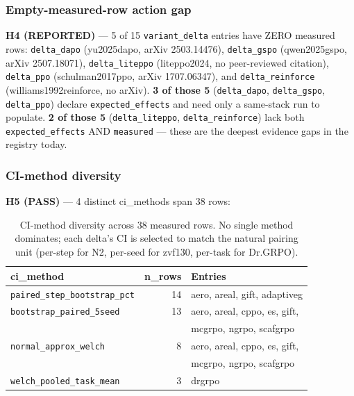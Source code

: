 \documentclass{article}
\begin{document}
\subsubsection{Empty-measured-row action gap}
\label{sec:p6-iter134-empty-action-gap}

\textbf{H4 (REPORTED)} --- 5 of 15 \texttt{variant\_delta} entries have
ZERO measured rows: \texttt{delta\_dapo} (yu2025dapo, arXiv 2503.14476),
\texttt{delta\_gspo} (qwen2025gspo, arXiv 2507.18071),
\texttt{delta\_liteppo} (liteppo2024, no peer-reviewed citation),
\texttt{delta\_ppo} (schulman2017ppo, arXiv 1707.06347), and
\texttt{delta\_reinforce} (williams1992reinforce, no arXiv).
\textbf{3 of those 5} (\texttt{delta\_dapo}, \texttt{delta\_gspo},
\texttt{delta\_ppo}) declare \texttt{expected\_effects} and need only a
same-stack run to populate. \textbf{2 of those 5}
(\texttt{delta\_liteppo}, \texttt{delta\_reinforce}) lack both
\texttt{expected\_effects} AND \texttt{measured} --- these are the
deepest evidence gaps in the registry today.

\subsubsection{CI-method diversity}
\label{sec:p6-iter134-ci-method-diversity}

\textbf{H5 (PASS)} --- 4 distinct ci\_methods span 38 rows:

\begin{table}[h]
\centering
\small
\begin{tabular}{lrl}
\toprule
\textbf{ci\_method} & \textbf{n\_rows} & \textbf{Entries} \\
\midrule
\texttt{paired\_step\_bootstrap\_pct} & 14 & aero, areal, gift, adaptiveg \\
\texttt{bootstrap\_paired\_5seed}     & 13 & aero, areal, cppo, es, gift, \\
                                       &    & mcgrpo, ngrpo, scafgrpo \\
\texttt{normal\_approx\_welch}       & 8  & aero, areal, cppo, es, gift, \\
                                       &    & mcgrpo, ngrpo, scafgrpo \\
\texttt{welch\_pooled\_task\_mean}   & 3  & drgrpo \\
\bottomrule
\end{tabular}
\caption{CI-method diversity across 38 measured rows. No single method
dominates; each delta's CI is selected to match the natural pairing
unit (per-step for N2, per-seed for zvf130, per-task for Dr.GRPO).}
\label{tab:p6-iter134-ci-diversity}
\end{table}
\end{document}
